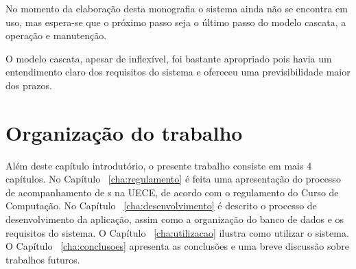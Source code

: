 No momento da elaboração desta monografia o sistema ainda não se encontra em uso,
mas espera-se que o próximo passo seja o último passo do modelo cascata, a operação
e manutenção.

O modelo cascata, apesar de inflexível, foi bastante apropriado pois havia um entendimento
claro dos requisitos do sistema e ofereceu uma previsibilidade maior dos prazos.

\section{Organização do trabalho}

Além deste capítulo introdutório, o presente trabalho consiste em mais 4 capítulos. 
No Capítulo ~\ref{cha:regulamento} é feita uma apresentação do processo de 
acompanhamento de s na UECE, de acordo
com o regulamento do Curso de Computação. No Capítulo ~\ref{cha:desenvolvimento} é 
descrito o processo de desenvolvimento da aplicação, assim como a organização do
banco de dados e os requisitos do sistema. 
O Capítulo ~\ref{cha:utilizacao} ilustra como utilizar o sistema. O Capítulo ~\ref{cha:conclusoes} 
apresenta as conclusões e uma breve discussão sobre trabalhos futuros.

